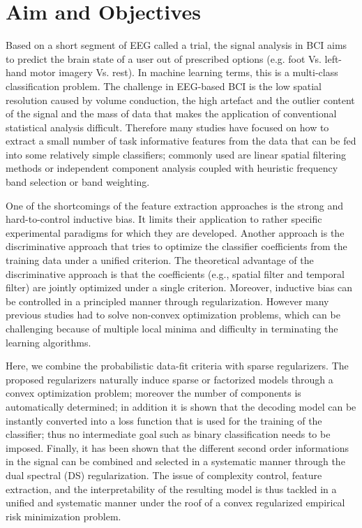 \section{Aim and Objectives}

Based on a short segment of EEG called a trial, the signal analysis in BCI aims to predict the brain state of a user out of prescribed options (e.g. foot Vs. left-hand motor imagery Vs. rest). In machine learning terms, this is a multi-class classification problem. The challenge in EEG-based BCI is the low spatial resolution caused by volume conduction, the high artefact and the outlier content of the signal and the mass of data that makes the application of conventional statistical analysis difficult. Therefore many studies have focused on how to extract a small number of task informative features from the data that can be fed into some relatively simple classifiers; commonly used are linear spatial filtering methods or independent component analysis coupled with heuristic frequency band selection or band weighting. 

One of the shortcomings of the feature extraction approaches is the strong and hard-to-control inductive bias. It limits their application to rather specific experimental paradigms for which they are developed. Another approach is the discriminative approach that tries to optimize the classifier coefficients from the training data under a unified criterion. The theoretical advantage of the discriminative approach is that the coefficients (e.g., spatial filter and temporal filter) are jointly optimized under a single criterion. Moreover, inductive bias can be controlled in a principled manner through regularization. However many previous studies had to solve non-convex optimization problems, which can be challenging because of multiple local minima and difficulty in terminating the learning algorithms.

Here, we combine the probabilistic data-fit criteria with sparse regularizers. The proposed regularizers naturally induce sparse or factorized models through a convex optimization problem; moreover the number of components is automatically determined; in addition it is shown that the decoding model can be instantly converted into a loss function that is used for the training of the classifier; thus no intermediate goal such as binary classification needs to be imposed. Finally, it has been shown that the different second order informations in the signal can be combined and selected in a systematic manner through the dual spectral (DS) regularization. The issue of complexity control, feature extraction, and the interpretability of the resulting model is thus tackled in a unified and systematic manner under the roof of a convex regularized empirical risk minimization problem.


